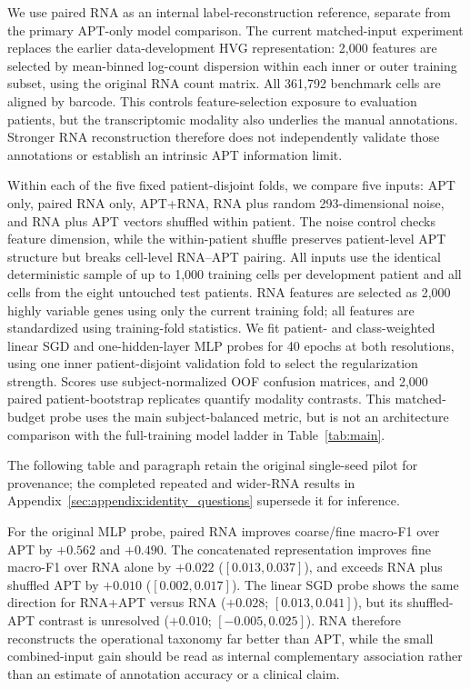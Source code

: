 \documentclass{article} %
\begin{document}
We use paired RNA as an internal label-reconstruction reference, separate from
the primary APT-only model comparison. The current matched-input experiment
replaces the earlier data-development HVG representation: 2{,}000 features
are selected by mean-binned log-count dispersion within each inner or outer
training subset, using the original RNA count matrix. All 361{,}792 benchmark
cells are aligned by barcode. This controls feature-selection exposure to
evaluation patients, but the transcriptomic modality also underlies the manual
annotations. Stronger RNA reconstruction therefore does not independently
validate those annotations or establish an intrinsic APT information limit.

Within each of the five fixed patient-disjoint folds, we compare five inputs:
APT only, paired RNA only, APT+RNA, RNA plus random 293-dimensional noise, and
RNA plus APT vectors shuffled within patient. The noise control checks feature
dimension, while the within-patient shuffle preserves patient-level APT
structure but breaks cell-level RNA--APT pairing. All inputs use the identical
deterministic sample of up to 1{,}000 training cells per development patient
and all cells from the eight untouched test patients. RNA features are selected
as 2{,}000 highly variable genes using only the current training fold; all
features are standardized using training-fold statistics. We fit patient- and
class-weighted linear SGD and one-hidden-layer MLP probes for 40 epochs at both
resolutions, using one inner patient-disjoint validation fold to select the
regularization strength. Scores use subject-normalized OOF confusion matrices,
and 2{,}000 paired patient-bootstrap replicates quantify modality contrasts.
This matched-budget probe uses the main subject-balanced metric, but is not
an architecture comparison with the full-training model ladder in
Table~\ref{tab:main}.

The following table and paragraph retain the original single-seed pilot for
provenance; the completed repeated and wider-RNA results in
Appendix~\ref{sec:appendix:identity_questions} supersede it for inference.


For the original MLP probe, paired RNA improves coarse/fine macro-F1 over APT by
$+0.562$ and $+0.490$. The concatenated representation improves fine macro-F1
over RNA alone by $+0.022$ ($[0.013,0.037]$), and exceeds RNA plus shuffled APT
by $+0.010$ ($[0.002,0.017]$). The linear SGD probe shows the same direction
for RNA+APT versus RNA ($+0.028$; $[0.013,0.041]$), but its shuffled-APT
contrast is unresolved ($+0.010$; $[-0.005,0.025]$). RNA therefore reconstructs
the operational taxonomy far better than APT, while the small combined-input
gain should be read as internal complementary association rather than an
estimate of annotation accuracy or a clinical claim.
\end{document}
